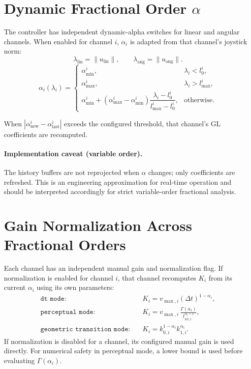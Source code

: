 \documentclass[11pt,a4paper]{article}
\begin{document}
\section{Dynamic Fractional Order \texorpdfstring{$\alpha$}{alpha}}
The controller has independent dynamic-alpha switches for linear and angular channels.
When enabled for channel $i$, $\alpha_i$ is adapted from that channel's joystick norm:
\begin{equation}
\lambda_{\mathrm{lin}} = \lVert u_{\mathrm{lin}} \rVert,\qquad
\lambda_{\mathrm{ang}} = \lVert u_{\mathrm{ang}} \rVert.
\end{equation}
\begin{equation}
\alpha_i(\lambda_i)=
\begin{cases}
\alpha^i_{\min}, & \lambda_i < l^i_0,\\
\alpha^i_{\max}, & \lambda_i > l^i_{\max},\\
\alpha^i_{\min} + (\alpha^i_{\max}-\alpha^i_{\min})\dfrac{\lambda_i-l^i_0}{l^i_{\max}-l^i_0}, & \text{otherwise}.
\end{cases}
\end{equation}

When $|\alpha^i_{\text{new}}-\alpha^i_{\text{last}}|$ exceeds the configured threshold, that channel's GL coefficients are recomputed.

\paragraph{Implementation caveat (variable order).}
The history buffers are not reprojected when $\alpha$ changes; only coefficients are refreshed.
This is an engineering approximation for real-time operation and should be interpreted accordingly
for strict variable-order fractional analysis.

\section{Gain Normalization Across Fractional Orders}
Each channel has an independent manual gain and normalization flag. If normalization is enabled for channel $i$,
that channel recomputes $K_i$ from its current $\alpha_i$ using its own parameters:
\begin{align}
\texttt{dt mode:} \quad & K_i = v_{\max,i}(\Delta t)^{1-\alpha_i}, \\
\texttt{perceptual mode:} \quad & K_i = v_{\max,i}\,\frac{\Gamma(\alpha_i)}{t_{\mathrm{ref},i}^{\alpha_i-1}},\\
\texttt{geometric transition mode:} \quad & K_i = k_{0,i}^{1-\alpha_i}k_{1,i}^{\alpha_i}.
\end{align}
If normalization is disabled for a channel, its configured manual gain is used directly.
For numerical safety in perceptual mode, a lower bound is used before evaluating $\Gamma(\alpha_i)$.
\end{document}
